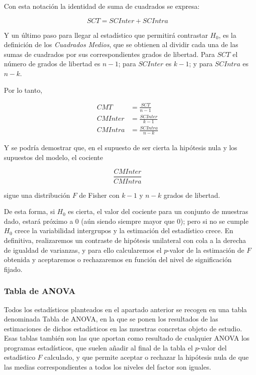 \documentclass[
  spanish,
  a4paper,
]{scrreport}
\theoremstyle{plain}
\theoremstyle{definition}
\theoremstyle{definition}
\theoremstyle{remark}
\begin{document}
Con esta notación la identidad de suma de cuadrados se expresa:

\[
SCT = SCInter + SCIntra
\]

Y un último paso para llegar al estadístico que permitirá contrastar
\(H_0\), es la definición de los \emph{Cuadrados Medios}, que se
obtienen al dividir cada una de las sumas de cuadrados por sus
correspondientes grados de libertad. Para \(SCT\) el número de grados de
libertad es \(n-1\); para \(SCInter\) es \(k-1\); y para \(SCIntra\) es
\(n-k\).

Por lo tanto,

\begin{align*}
CMT &= \frac{SCT}{n - 1}\\
CMInter &= \frac{SCInter}{k - 1}\\
CMIntra &= \frac{SCIntra}{n -k}
\end{align*}

Y se podría demostrar que, en el supuesto de ser cierta la hipótesis
nula y los supuestos del modelo, el cociente

\[
\frac{{CMInter}}{{CMIntra}}
\]

sigue una distribución \(F\) de Fisher con \(k-1\) y \(n-k\) grados de
libertad.

De esta forma, si \(H_0\) es cierta, el valor del cociente para un
conjunto de muestras dado, estará próximo a 0 (aún siendo siempre mayor
que 0); pero si no se cumple \(H_0\) crece la variabilidad intergrupos y
la estimación del estadístico crece. En definitiva, realizaremos un
contraste de hipótesis unilateral con cola a la derecha de igualdad de
varianzas, y para ello calcularemos el \(p\)-valor de la estimación de
\(F\) obtenida y aceptaremos o rechazaremos en función del nivel de
significación fijado.

\subsubsection{Tabla de ANOVA}\label{tabla-de-anova}

Todos los estadísticos planteados en el apartado anterior se recogen en
una tabla denominada Tabla de ANOVA, en la que se ponen los resultados
de las estimaciones de dichos estadísticos en las muestras concretas
objeto de estudio. Esas tablas también son las que aportan como
resultado de cualquier ANOVA los programas estadísticos, que suelen
añadir al final de la tabla el \(p\)-valor del estadístico \(F\)
calculado, y que permite aceptar o rechazar la hipótesis nula de que las
medias correspondientes a todos los niveles del factor son iguales.
\end{document}
